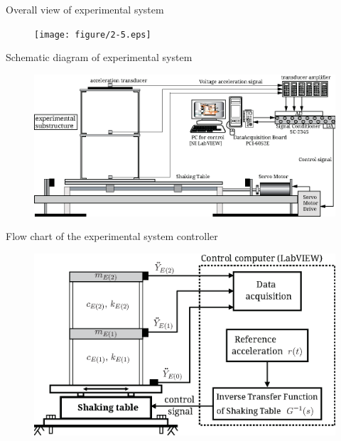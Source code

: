 \documentclass[usepdftitle=false]{beamer}
\begin{document}
\begin{frame}{Overall view of experimental system}
\begin{figure}[ht]
\centering
\texttt{[image: figure/2-5.eps]}
\end{figure}
\end{frame}


\begin{frame}{Schematic diagram of experimental system}
\begin{figure}[ht]
\centering
\includegraphics[width=1\textwidth] {figure/2-6.eps}
\end{figure}
\end{frame}

\begin{frame}{Flow chart of the experimental system controller}
\begin{figure}[ht]
\centering
\includegraphics[width=1\textwidth] {figure/2-8.eps}
\end{figure}
\end{frame}
\end{document}
